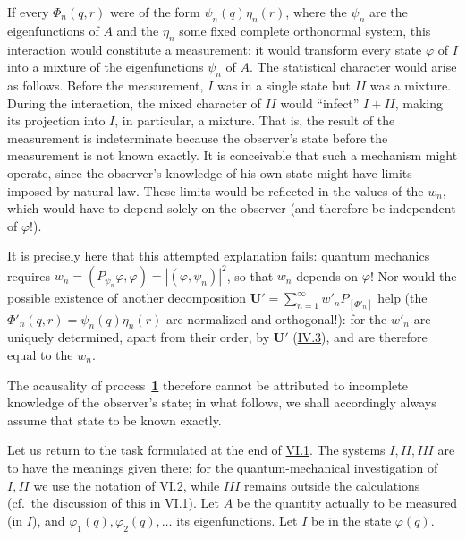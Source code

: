 \documentclass[fontsize=13pt,twoside,openany,headings=normal,parskip=false,bookmarkpackage=false,DIV=calc]{scrbook}
\begin{document}
If every $\Phi_n(q,r)$ were of the form $\psi_n(q)\eta_n(r)$, where the $\psi_n$ are the eigenfunctions of $A$ and the $\eta_n$ some fixed complete orthonormal system, this interaction would constitute a measurement: it would transform every state $\varphi$ of $I$ into a mixture of the eigenfunctions $\psi_n$ of $A$. The statistical character would arise as follows. Before the measurement, $I$ was in a single state but $II$ was a mixture. During the interaction, the mixed character of $II$ would ``infect'' $I+II$, making its projection into $I$, in particular, a mixture. That is, the result of the measurement is indeterminate because the observer's state before the measurement is not known exactly. It is conceivable that such a mechanism might operate, since the observer's knowledge of his own state might have limits imposed by natural law. These limits would be reflected in the values of the $w_n$, which would have to depend solely on the observer (and therefore be independent of $\varphi$!).

It is precisely here that this attempted explanation fails: quantum mechanics requires $w_n=(P_{\psi_n}\varphi,\varphi)=|(\varphi,\psi_n)|^2$, so that $w_n$ depends on $\varphi$! Nor would the possible existence of another decomposition $\boldsymbol U'=\sum_{n=1}^{\infty}w'_nP_{[\Phi'_n]}$ help (the $\Phi'_n(q,r)=\psi_n(q)\eta_n(r)$ are normalized and orthogonal!): for the $w'_n$ are uniquely determined, apart from their order, by $\boldsymbol U'$ (\hyperref[sec:IV.3]{IV.3}), and are therefore equal to the $w_n$.

The acausality of process~\hyperref[eq:V.1.1]{\textbf{1}} therefore cannot be attributed to incomplete knowledge of the observer's state; in what follows, we shall accordingly always assume that state to be known exactly.
\hypertarget{origpage-234}{}%

Let us return to the task formulated at the end of \hyperref[sec:VI.1]{VI.1}. The systems $I,II,III$ are to have the meanings given there; for the quantum-mechanical investigation of $I,II$ we use the notation of \hyperref[sec:VI.2]{VI.2}, while $III$ remains outside the calculations (cf.\ the discussion of this in \hyperref[sec:VI.1]{VI.1}). Let $A$ be the quantity actually to be measured (in $I$), and $\varphi_1(q),\varphi_2(q),\ldots$ its eigenfunctions. Let $I$ be in the state $\varphi(q)$.
\end{document}
